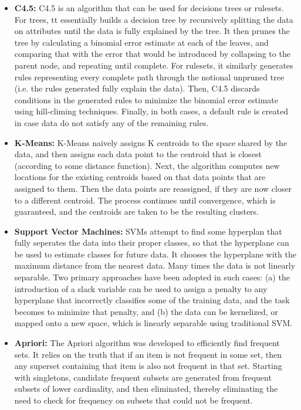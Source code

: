 \documentclass[fleqn,10pt]{SelfArx} %
\begin{document}
\begin{itemize}
	\item{\textbf{C4.5:}} C4.5 is an algorithm that can be used for decisions trees or rulesets. For trees, tt essentially builds a decision tree by recursively splitting the data on attributes until the data is fully explained by the tree.  It then prunes the tree by calculating a binomial error estimate at each of the leaves, and comparing that with the error that would be introduced by collapsing to the parent node, and repeating until complete.  For rulesets, it similarly generates rules representing every complete path through the notional unpruned tree (i.e. the rules generated fully explain the data).  Then, C4.5 discards conditions in the generated rules to minimize the binomial error estimate using hill-climing techniques.  Finally, in both cases, a default rule is created in case data do not satisfy any of the remaining rules.
	\item{\textbf{K-Means:}} K-Means naively assigns K centroids to the space shared by the data, and then assigns each data point to the centroid that is closest (according to some distance function).  Next, the algorithm computes new locations for the existing centroids based on that data points that are assigned to them.  Then the data points are reassigned, if they are now closer to a different centroid.  The process continues until convergence, which is guaranteed, and the centroids are taken to be the resulting clusters.
	\item{\textbf{Support Vector Machines:}} SVMs attempt to find some hyperplan that fully seperates the data into their proper classes, so that the hyperplane can be used to estimate classes for future data.  It chooses the hyperplane with the maximum distance from the nearest data.  Many times the data is not linearly separable.  Two primary approaches have been adopted in such cases: (a) the introduction of a slack variable can be used to assign a penalty to any hyperplane that incorrectly classifies some of the training data, and the task becomes to minimize that penalty, and (b) the data can be kernelized, or mapped onto a new space, which is linearly separable using traditional SVM. 
	\item{\textbf{Apriori:}} The Apriori algorithm was developed to efficiently find frequent sets.  It relies on the truth that if an item is not frequent in some set, then any superset containing that item is also not frequent in that set.  Starting with singletons, candidate frequent subsets are generated from frequent subsets of lower cardinality, and then eliminated, thereby eliminating the need to check for frequency on subsets that could not be frequent.

\end{itemize}
\end{document}
